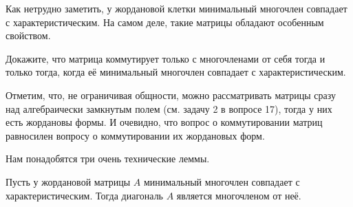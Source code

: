 Как нетрудно заметить, у жордановой клетки минимальный многочлен совпадает с характеристическим. На самом деле, такие матрицы обладают особенным свойством.

\begin{problem}[А.\,А. Клячко]
    Докажите, что матрица коммутирует только с многочленами от себя тогда и только тогда, когда её минимальный многочлен совпадает с характеристическим.
\end{problem}

Отметим, что, не ограничивая общности, можно рассматривать матрицы сразу над алгебраически замкнутым полем (см. задачу 2 в вопросе 17), тогда у них есть жордановы формы. И очевидно, что вопрос о коммутировании матриц равносилен вопросу о коммутировании их жордановых форм.

Нам понадобятся три очень технические леммы.

\begin{lemma}
    Пусть у жордановой матрицы $A$ минимальный многочлен совпадает с характеристическим. Тогда диагональ $A$ является многочленом от неё.
\end{lemma}

